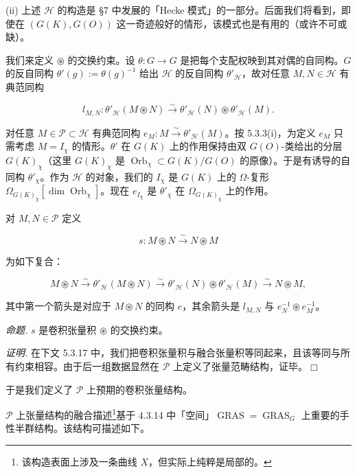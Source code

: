 (ii) 上述 $\mathcal{H}$ 的构造是 §7 中发展的「Hecke 模式」的一部分。后面我们将看到，即使在 $(G(K),G(O))$ 这一奇迹般好的情形，该模式也是有用的（或许不可或缺）。

 我们来定义 $\circledast$ 的交换约束。设 $\theta:G\to G$ 是把每个支配权映到其对偶的自同构。$G$ 的反自同构 $\theta'(g):=\theta(g)^{-1}$ 给出 $\mathcal{H}$ 的反自同构 $\theta'_{\mathcal{H}}$，故对任意 $M,N\in\mathcal{H}$ 有典范同构

\[
l_{M,N}:\theta'_{\mathcal{H}}(M\circledast N)\xrightarrow{\sim}\theta'_{\mathcal{H}}(N)\circledast\theta'_{\mathcal{H}}(M).
\]

对任意 $M\in\mathcal{P}\subset\mathcal{H}$ 有典范同构 $e_M:M\xrightarrow{\sim}\theta'_{\mathcal{H}}(M)$。按 5.3.3(i)，为定义 $e_M$ 只需考虑 $M=I_\chi$ 的情形。$\theta'$ 在 $G(K)$ 上的作用保持由双 $G(O)$-类给出的分层 $G(K)_\chi$（这里 $G(K)_\chi$ 是 $\operatorname{Orb}_\chi\subset G(K)/G(O)$ 的原像）。于是有诱导的自同构 $\theta'_\chi$。作为 $\mathcal{H}$ 的对象，我们的 $I_\chi$ 是 $G(K)$ 上的 $\Omega$-复形 $\Omega_{G(K)_\chi}[\dim\operatorname{Orb}_\chi]$。现在 $e_{I_\chi}$ 是 $\theta'_\chi$ 在 $\Omega_{G(K)_\chi}$ 上的作用。

对 $M,N\in\mathcal{P}$ 定义

\begin{equation}\tag{261}
s:M\circledast N\xrightarrow{\sim}N\circledast M
\end{equation}

为如下复合：

\[
M\circledast N\xrightarrow{\sim}\theta'_{\mathcal{H}}(M\circledast N)\xrightarrow{\sim}\theta'_{\mathcal{H}}(N)\circledast\theta'_{\mathcal{H}}(M)\xrightarrow{\sim}N\circledast M,
\]

其中第一个箭头是对应于 $M\circledast N$ 的同构 $e$，其余箭头是 $l_{M,N}$ 与 $e_N^{-1}\circledast e_M^{-1}$。

 \emph{命题.} $s$ 是卷积张量积 $\circledast$ 的交换约束。

\emph{证明.} 在下文 5.3.17 中，我们把卷积张量积与融合张量积等同起来，且该等同与所有约束相容。由于后一组数据显然在 $\mathcal{P}$ 上定义了张量范畴结构，证毕。\hfill$\Box$

于是我们定义了 $\mathcal{P}$ 上预期的卷积张量结构。

 $\mathcal{P}$ 上张量结构的融合描述\footnote{该构造表面上涉及一条曲线 $X$，但实际上纯粹是局部的。}基于 4.3.14 中「空间」$\operatorname{GRAS}=\operatorname{GRAS}_G$ 上重要的手性半群结构。该结构可描述如下。

